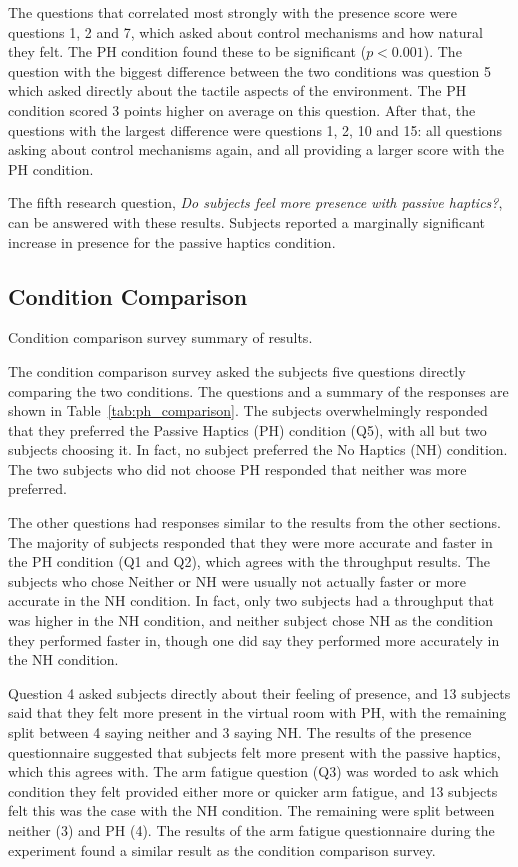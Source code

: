 The questions that correlated most strongly with the presence score were questions 1, 2 and 7, which asked about control mechanisms and how natural they felt.
The PH condition found these to be significant ($p<0.001$).
The question with the biggest difference between the two conditions was question 5 which asked directly about the tactile aspects of the environment.
The PH condition scored 3 points higher on average on this question.
After that, the questions with the largest difference were questions 1, 2, 10 and 15: all questions asking about control mechanisms again, and all providing a larger score with the PH condition.

The fifth research question, \textit{Do subjects feel more presence with passive haptics?}, can be answered with these results.
Subjects reported a marginally significant increase in presence for the passive haptics condition.

\subsection{Condition Comparison}

\begin{table}
    \centering
    \caption{Condition comparison survey summary of results.}
    \label{tab:ph_comparison}
\end{table}

The condition comparison survey asked the subjects five questions directly comparing the two conditions.
The questions and a summary of the responses are shown in Table~\ref{tab:ph_comparison}.
The subjects overwhelmingly responded that they preferred the Passive Haptics (PH) condition (Q5), with all but two subjects choosing it.
In fact, no subject preferred the No Haptics (NH) condition.
The two subjects who did not choose PH responded that neither was more preferred.

The other questions had responses similar to the results from the other sections.
The majority of subjects responded that they were more accurate and faster in the PH condition (Q1 and Q2), which agrees with the throughput results.
The subjects who chose Neither or NH were usually not actually faster or more accurate in the NH condition.
In fact, only two subjects had a throughput that was higher in the NH condition, and neither subject chose NH as the condition they performed faster in, though one did say they performed more accurately in the NH condition.

Question 4 asked subjects directly about their feeling of presence, and 13 subjects said that they felt more present in the virtual room with PH, with the remaining split between 4 saying neither and 3 saying NH.
The results of the presence questionnaire suggested that subjects felt more present with the passive haptics, which this agrees with.
The arm fatigue question (Q3) was worded to ask which condition they felt provided either more or quicker arm fatigue, and 13 subjects felt this was the case with the NH condition.
The remaining were split between neither (3) and PH (4).
The results of the arm fatigue questionnaire during the experiment found a similar result as the condition comparison survey.

